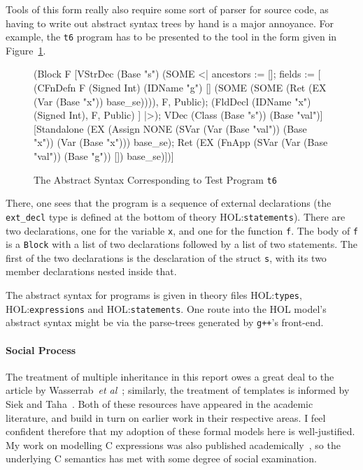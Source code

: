 \documentclass[11pt]{article}
\newcommand{\HOLfile}[1]{HOL:\texttt{#1}}
\begin{document}
Tools of this form really also require some sort of parser for \cpp{}
source code, as having to write out abstract syntax trees by hand is a
major annoyance.  For example, the \texttt{t6} program has to be
presented to the tool in the form given in
Figure~\ref{fig:translated-t6}.
\begin{figure}
\begin{stdrule}
    [Decl (VDec (Signed Int) (Base "x"));
     FnDefn (Signed Int) (Base "f") []
       (Block F
          [VStrDec (Base "s")
             (SOME <|
                ancestors := [];
                fields := [
                  (CFnDefn F (Signed Int) (IDName "g") []
                           (SOME
                              (SOME (Ret (EX (Var (Base "x"))
                                             base_se)))),
                   F, Public);
                  (FldDecl (IDName "x") (Signed Int),
                   F, Public)
                ]
               |>);
           VDec (Class (Base "s")) (Base "val")]
          [Standalone
             (EX
              (Assign NONE
                      (SVar (Var (Base "val")) (Base "x"))
                      (Var (Base "x")))
              base_se);
           Ret (EX (FnApp (SVar (Var (Base "val")) (Base "g"))
                          [])
                   base_se)])]
\end{stdrule}
\caption{The Abstract Syntax Corresponding to Test Program
  \texttt{t6}}
\label{fig:translated-t6}
\end{figure}
There, one sees that the program is a sequence of external
declarations (the \texttt{ext_decl} type is defined at the bottom of
theory \HOLfile{statements}).  There are two declarations, one for the
variable \texttt{x}, and one for the function \texttt{f}.  The body of
\texttt{f} is a \texttt{Block} with a list of two declarations
followed by a list of two statements.  The first of the two
declarations is the desclaration of the struct \texttt{s}, with its
two member declarations nested inside that.

The abstract syntax for \cpp{} programs is given in theory files
\HOLfile{types}, \HOLfile{expressions} and \HOLfile{statements}.  One
route into the HOL model's abstract syntax might be via the
parse-trees generated by \texttt{g++}'s front-end.

\paragraph{Social Process}
The treatment of multiple inheritance in this report owes a great deal
to the article by Wasserrab~\emph{et
  al}~\cite{wasserrab-nst-OOPSLA06}; similarly, the treatment of
templates is informed by Siek and Taha~\cite{DBLP:conf/ecoop/SiekT06}.
Both of these resources have appeared in the academic literature, and
build in turn on earlier work in their respective areas.  I feel
confident therefore that my adoption of these formal models here is
well-justified.  My work on modelling C expressions was also published
academically~\cite{norrish99}, so the underlying C semantics has met
with some degree of social examination.
\end{document}

